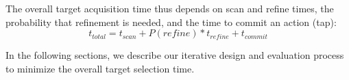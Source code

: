 The overall target acquisition time thus depends on scan and refine times, the probability that refinement is needed, and the time to commit an action (tap):
\begin{equation}
t_{total}=t_{scan}+P(refine)*t_{refine}+t_{commit}
\label{eq:time}
\end{equation}

In the following sections, we describe our iterative design and evaluation process to minimize the overall target selection time.

